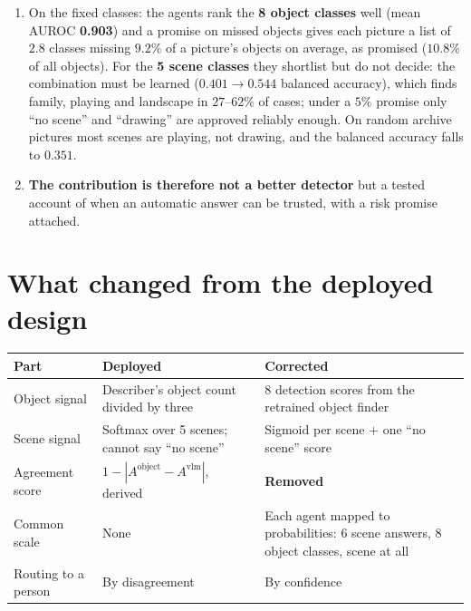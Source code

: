 \documentclass[10pt,a4paper]{article}
\newcommand{\num}[1]{\textbf{#1}}
\begin{document}
\begin{enumerate}[leftmargin=1.4em, itemsep=2pt, topsep=3pt]
  \item On the fixed classes: the agents rank the \textbf{8 object classes} well (mean AUROC \num{0.903}) and a promise on missed objects gives each picture a list of $2.8$ classes missing $9.2\%$ of a picture's objects on average, as promised ($10.8\%$ of all objects). For the \textbf{5 scene classes} they shortlist but do not decide: the combination must be learned ($0.401 \to 0.544$ balanced accuracy), which finds family, playing and landscape in $27$--$62\%$ of cases; under a $5\%$ promise only ``no scene'' and ``drawing'' are approved reliably enough. On random archive pictures most scenes are playing, not drawing, and the balanced accuracy falls to $0.351$.
  \item \textbf{The contribution is therefore not a better detector} but a tested account of when an automatic answer can be trusted, with a risk promise attached.
\end{enumerate}

\section{What changed from the deployed design}
\begin{center}\footnotesize
\begin{tabular}{p{3.0cm} p{6.4cm} p{6.4cm}}
\toprule
\textbf{Part} & \textbf{Deployed} & \textbf{Corrected} \\
\midrule
Object signal & Describer's object count divided by three & 8 detection scores from the retrained object finder \\
Scene signal & Softmax over 5 scenes; cannot say ``no scene'' & Sigmoid per scene + one ``no scene'' score \\
Agreement score & $1-|A^{\text{object}}-A^{\text{vlm}}|$, derived & \textbf{Removed} \\
Common scale & None & Each agent mapped to probabilities: 6 scene answers, 8 object classes, scene at all \\
Routing to a person & By disagreement & By confidence \\
\bottomrule
\end{tabular}
\end{center}
\end{document}
